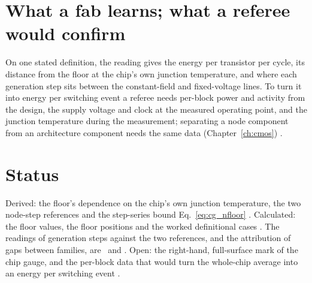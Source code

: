 \section{What a fab learns; what a referee would confirm}\label{sec:cg_use}
On one stated definition, the reading gives the energy per transistor per cycle, its distance from the floor at the chip's own junction
temperature, and where each generation step sits between the constant-field and fixed-voltage lines. To turn it into energy per switching
event a referee needs per-block power and activity from the design, the supply voltage and clock at the measured operating point, and the
junction temperature during the measurement; separating a node component from an architecture component needs the same data
(Chapter~\ref{ch:cmos}) \openprob.

\section{Status}
Derived: the floor's dependence on the chip's own junction temperature, the two node-step references and the step-series bound
Eq.~\eqref{eq:cg_nfloor} \derived. Calculated: the floor values, the floor positions and the worked definitional cases \calc. The readings of
generation steps against the two references, and the attribution of gaps between families, are \interp\ and \conjecture. Open: the
right-hand, full-surface mark of the chip gauge, and the per-block data that would turn the whole-chip average into an energy per switching
event \openprob.
